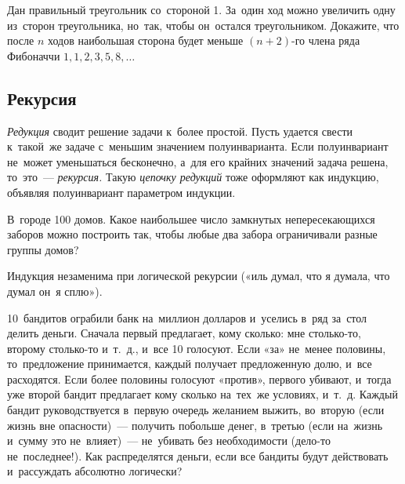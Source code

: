 \begin{problems}

\item
Дан правильный треугольник со~стороной 1.
За~один ход можно увеличить одну из~сторон треугольника, но~так, чтобы
он~остался треугольником.
Докажите, что после $n$ ходов наибольшая сторона будет меньше $(n + 2)$-го
члена ряда Фибоначчи $1, 1, 2, 3, 5, 8, \ldots$

\end{problems}

\subsection*{Рекурсия}

\emph{Редукция} сводит решение задачи к~более простой.
Пусть удается свести к~такой~же задаче с~меньшим значением полуинварианта.
Если полуинвариант не~может уменьшаться бесконечно, а~для его крайних значений
задача решена, то~это~— \emph{рекурсия.}
Такую \emph{цепочку редукций} тоже оформляют как индукцию, объявляя
полуинвариант параметром индукции.

\begin{problems}

\item
В~городе 100 домов.
Какое наибольшее число замкнутых непересекающихся заборов можно построить так,
чтобы любые два забора ограничивали разные группы домов?

\end{problems}

Индукция незаменима при логической рекурсии
(«иль думал, что я думала, что думал он~я сплю»).

\begin{problems}

\item
10~бандитов ограбили банк на~миллион долларов и~уселись в~ряд за~стол делить
деньги.
Сначала первый предлагает, кому сколько: мне столько-то, второму столько-то
и~т.~д., и~все 10 голосуют.
Если «за» не~менее половины, то~предложение принимается, каждый получает
предложенную долю, и~все расходятся.
Если более половины голосуют «против», первого убивают, и~тогда уже второй
бандит предлагает кому сколько на~тех~же условиях, и~т.~д.
Каждый бандит руководствуется в~первую очередь желанием выжить, во~вторую
(если жизнь вне опасности)~— получить побольше денег, в~третью
(если на~жизнь и~сумму это не~влияет)~— не~убивать без необходимости
(дело-то не~последнее!).
Как распределятся деньги, если все бандиты будут действовать и~рассуждать
абсолютно логически?

\end{problems}

